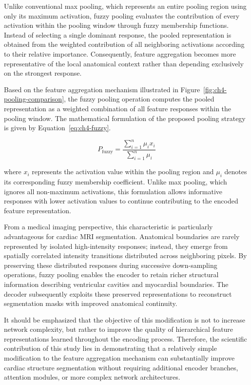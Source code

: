 Unlike conventional max pooling, which represents an entire pooling region using only its maximum activation, fuzzy pooling evaluates the contribution of every activation within the pooling window through fuzzy membership functions. Instead of selecting a single dominant response, the pooled representation is obtained from the weighted contribution of all neighboring activations according to their relative importance. Consequently, feature aggregation becomes more representative of the local anatomical context rather than depending exclusively on the strongest response.

Based on the feature aggregation mechanism illustrated in Figure~\ref{fig:ch4-pooling-comparison}, the fuzzy pooling operation computes the pooled representation as a weighted combination of all feature responses within the pooling window. The mathematical formulation of the proposed pooling strategy is given by Equation~\eqref{eq:ch4-fuzzy}.

\begin{equation}
	P_{\mathrm{fuzzy}}
	=
	\frac{\sum_{i=1}^{n}\mu_i x_i}
	{\sum_{i=1}^{n}\mu_i}
	\label{eq:ch4-fuzzy}
\end{equation}

where \(x_i\) represents the activation value within the pooling region and \(\mu_i\) denotes its corresponding fuzzy membership coefficient. Unlike max pooling, which ignores all non-maximum activations, this formulation allows informative responses with lower activation values to continue contributing to the encoded feature representation.

From a medical imaging perspective, this characteristic is particularly advantageous for cardiac MRI segmentation. Anatomical boundaries are rarely represented by isolated high-intensity responses; instead, they emerge from spatially correlated intensity transitions distributed across neighboring pixels. By preserving these distributed responses during successive down-sampling operations, fuzzy pooling enables the encoder to retain richer structural information describing ventricular cavities and myocardial boundaries. The decoder subsequently exploits these preserved representations to reconstruct segmentation masks with improved anatomical continuity.

It should be emphasized that the objective of this modification is not to increase network complexity, but rather to improve the quality of hierarchical feature representations learned throughout the encoding process. Therefore, the scientific contribution of this study lies in demonstrating that a relatively simple modification to the feature aggregation mechanism can substantially improve cardiac structure segmentation without requiring additional encoder branches, attention modules, or more complex network architectures.

